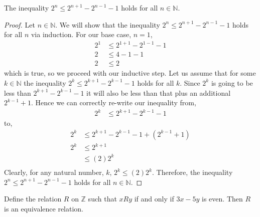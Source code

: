 \documentclass[12pt]{article}
\newenvironment{theorem}[2][Theorem]{\begin{trivlist}
\item[\hskip \labelsep {\bfseries #1}\hskip \labelsep {\bfseries #2.}]}{\end{trivlist}}
\begin{document}
\begin{theorem}{2}
	The inequality $2^n \leq 2^{n+1}-2^{n-1}-1$ holds for all $n \in \mathbb{N}$.
	\begin{proof}
	Let $n \in \mathbb{N}$. We will show that 
	the inequality $2^n \leq 2^{n+1}-2^{n-1}-1$ holds for all $n$
	via induction. For our base case, $n=1$,
	\begin{align*}
		2^{1} &\leq 2^{1+1} -2^{1-1}-1\\
		2 &\leq 4-1-1\\
		2 &\leq 2
	\end{align*}
	which is true, so we proceed with our inductive step. Let us assume that for some $k \in \mathbb{N}$
	the inequality $2^k \leq 2^{k+1}-2^{k-1}-1$ holds for all $k$. Since $2^k$ is going to be less
	than $2^{k+1}-2^{k-1}-1$ it will also be less than that plus an additional $2^{k-1}+1$. Hence we can correctly
	re-write our inequality from,
	\begin{align*}
		2^k &\leq 2^{k+1}-2^{k-1}-1
	\end{align*}
	to,
	\begin{align*}
		2^k &\leq 2^{k+1}-2^{k-1}-1 + (2^{k-1}+1)\\
		2^k &\leq 2^{k+1}\\
		    &\leq (2)2^k\\
	\end{align*}
	Clearly, for any natural number, $k$, $2^k \leq (2)2^k$. Therefore,
	the inequality $2^n \leq 2^{n+1}-2^{n-1}-1$ holds for all $n \in \mathbb{N}$.

	\end{proof}
\end{theorem}
\begin{theorem}{3}
	Define the relation $R$ on $\mathbb{Z}$ such that $xRy$ if and only if $3x-5y$ is even. Then $R$ is an equivalence relation.\\
\end{theorem}
\end{document}
